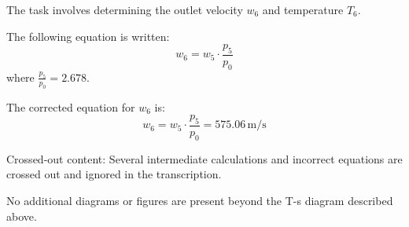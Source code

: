 The task involves determining the outlet velocity \( w_6 \) and temperature \( T_6 \).  

The following equation is written:  
\[
w_6 = w_5 \cdot \frac{p_5}{p_0}
\]  
where \( \frac{p_5}{p_0} = 2.678 \).  

The corrected equation for \( w_6 \) is:  
\[
w_6 = w_5 \cdot \frac{p_5}{p_0} = 575.06 \, \text{m/s}
\]  

Crossed-out content: Several intermediate calculations and incorrect equations are crossed out and ignored in the transcription.  

No additional diagrams or figures are present beyond the T-s diagram described above.
